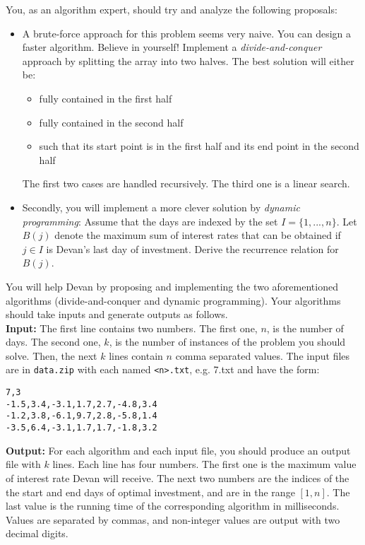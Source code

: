 \documentclass{article}
\begin{document}
You, as an algorithm expert, should try and analyze the following proposals:
\begin{itemize}
\item A brute-force approach for this problem seems very naive. You can design a
faster algorithm. Believe in yourself! Implement a \emph{divide-and-conquer}
approach by splitting the array into two halves. The best solution will either
be:
\begin{itemize}
\item fully contained in the first half
\item fully contained in the second half
\item such that its start point is in the first half and its end point in the second half
\end{itemize}
The first two cases are handled recursively. The third one is a linear search.
\item Secondly, you will implement a more clever solution by \emph{dynamic
programming}: 
Assume that the days are indexed by the set $I=\{1,...,n\}$. Let $B(j)$ denote
the maximum sum of interest rates that can be obtained if $j\in I$ is Devan's
last day of investment. Derive the recurrence relation for $B(j)$. 

\end{itemize}
You will help Devan by proposing and implementing the two aforementioned algorithms
(divide-and-conquer and dynamic programming). Your algorithms should take
inputs and generate outputs as follows.\\

{\bf Input:} The first line contains two numbers. The first one, $n$, is the
number of days. The second one, $k$, is the number of instances of the problem
you should solve. Then, the next $k$ lines contain $n$ comma separated values.
The input files are in \verb=data.zip= with each named \verb=<n>.txt=, e.g. 7.txt and have the form:
\begin{verbatim}
7,3
-1.5,3.4,-3.1,1.7,2.7,-4.8,3.4
-1.2,3.8,-6.1,9.7,2.8,-5.8,1.4
-3.5,6.4,-3.1,1.7,1.7,-1.8,3.2
\end{verbatim}

{\bf Output:} For each algorithm and each input file, you should produce an output
file with $k$ lines. Each line has four numbers. The first one is the maximum
value of interest rate Devan will receive. The next two numbers are the
indices of the the start and end days of optimal investment, and are in the
range $[1,n]$. The last value is the running time of the corresponding
algorithm in milliseconds. Values are separated by commas, and non-integer
values are output with two decimal digits.
\end{document}
